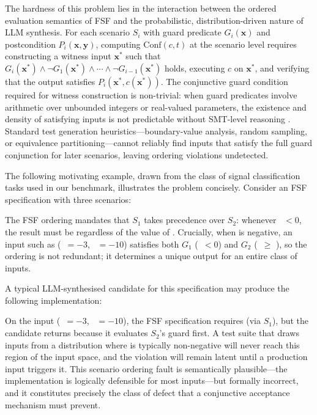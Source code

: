 The hardness of this problem lies in the interaction between the ordered evaluation semantics of FSF and the probabilistic, distribution-driven nature of LLM synthesis.  For each scenario $S_i$ with guard predicate $G_i(\mathbf{x})$ and postcondition $P_i(\mathbf{x}, \mathbf{y})$, computing $\mathrm{Conf}(c, t)$ at the scenario level requires constructing a witness input $\mathbf{x}^* $ such that $G_i(\mathbf{x}^*) \wedge \neg G_1(\mathbf{x}^*) \wedge \cdots \wedge \neg G_{i-1}(\mathbf{x}^*)$ holds, executing $c$ on $\mathbf{x}^*$, and verifying that the output satisfies $P_i(\mathbf{x}^*, c(\mathbf{x}^*))$.  The conjunctive guard condition required for witness construction is non-trivial: when guard predicates involve arithmetic over unbounded integers or real-valued parameters, the existence and density of satisfying inputs is not predictable without SMT-level reasoning \citep{barrett2018smt}.  Standard test generation heuristics—boundary-value analysis, random sampling, or equivalence partitioning—cannot reliably find inputs that satisfy the full guard conjunction for later scenarios, leaving ordering violations undetected.

The following motivating example, drawn from the class of signal classification tasks used in our benchmark, illustrates the problem concisely.  Consider an FSF specification with three scenarios:


\noindent The FSF ordering mandates that $S_1$ takes precedence over $S_2$: whenever ~$< 0$, the result must be  regardless of the value of .  Crucially, when  is negative, an input such as (~$= -3$, ~$= -10$) satisfies both $G_1$ (~$< 0$) and $G_2$ (~$\geq$ ), so the ordering is not redundant; it determines a unique output for an entire class of inputs.

A typical LLM-synthesised candidate for this specification may produce the following implementation:


\noindent On the input (~$= -3$, ~$= -10$), the FSF specification requires  (via $S_1$), but the candidate returns  because it evaluates $S_2$'s guard first.  A test suite that draws inputs from a distribution where  is typically non-negative will never reach this region of the input space, and the violation will remain latent until a production input triggers it.  This scenario ordering fault is semantically plausible—the implementation is logically defensible for most inputs—but formally incorrect, and it constitutes precisely the class of defect that a conjunctive acceptance mechanism must prevent.


